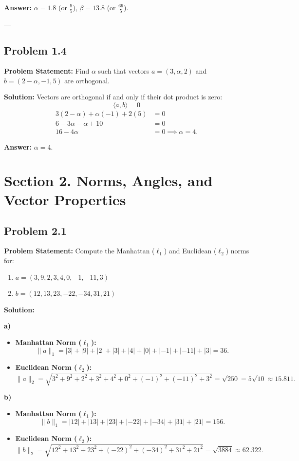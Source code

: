 \documentclass[11pt, a4paper]{article}
\begin{document}
\textbf{Answer:} $\alpha = 1.8$ (or $\frac{9}{5}$), $\beta = 13.8$ (or $\frac{69}{5}$).

---

\subsection*{Problem 1.4}
\textbf{Problem Statement:} Find $\alpha$ such that vectors $a=(3,\alpha,2)$ and $b=(2-\alpha,-1,5)$ are orthogonal.

\textbf{Solution:}
Vectors are orthogonal if and only if their dot product is zero:
$$ \langle a, b \rangle = 0 $$
\begin{align*}
3(2 - \alpha) + \alpha(-1) + 2(5) &= 0 \\
6 - 3\alpha - \alpha + 10 &= 0 \\
16 - 4\alpha &= 0 \implies \alpha = 4.
\end{align*}

\textbf{Answer:} $\alpha = 4$.

\newpage

\section{Section 2. Norms, Angles, and Vector Properties}

\subsection*{Problem 2.1}
\textbf{Problem Statement:} Compute the Manhattan ($\ell_1$) and Euclidean ($\ell_2$) norms for:
\begin{enumerate}[label=\alph*)]
\item $a = (3, 9, 2, 3, 4, 0, -1, -11, 3)$
\item $b = (12, 13, 23, -22, -34, 31, 21)$
\end{enumerate}

\textbf{Solution:}

\textbf{a)}
\begin{itemize}
\item \textbf{Manhattan Norm ($\ell_1$):}
$$ \|a\|_1 = |3| + |9| + |2| + |3| + |4| + |0| + |-1| + |-11| + |3| = 36. $$
\item \textbf{Euclidean Norm ($\ell_2$):}
$$ \|a\|_2 = \sqrt{3^2 + 9^2 + 2^2 + 3^2 + 4^2 + 0^2 + (-1)^2 + (-11)^2 + 3^2} = \sqrt{250} = 5\sqrt{10} \approx 15.811. $$
\end{itemize}

\textbf{b)}
\begin{itemize}
\item \textbf{Manhattan Norm ($\ell_1$):}
$$ \|b\|_1 = |12| + |13| + |23| + |-22| + |-34| + |31| + |21| = 156. $$
\item \textbf{Euclidean Norm ($\ell_2$):}
$$ \|b\|_2 = \sqrt{12^2 + 13^2 + 23^2 + (-22)^2 + (-34)^2 + 31^2 + 21^2} = \sqrt{3884} \approx 62.322. $$
\end{itemize}
\end{document}
